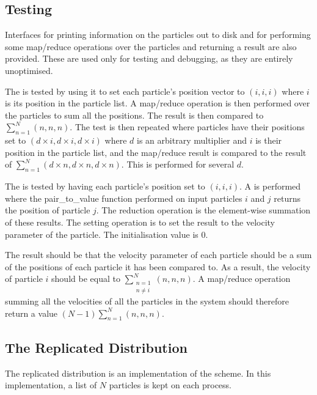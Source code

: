 \subsection{Testing}

Interfaces for printing information on the particles
out to disk and for performing some map/reduce operations over
the particles and returning a result are also provided.
%
These are used only for testing and debugging, as they are entirely
unoptimised.

The \individualoperation{} is tested by using it to set each particle's
position vector to $(i, i, i)$ where $i$ is its position in the
particle list.
%
A map/reduce operation is then performed over the particles to
sum all the positions.
%
The result is then compared to $\sum_{n=1}^N (n, n, n)$.
%
The test is then repeated where particles have their positions set to
$(d\times{}i, d\times{}i, d\times{}i)$
where $d$ is an arbitrary multiplier and $i$ is their
position in the particle list, and the map/reduce result is
compared to the result of $\sum_{n=1}^N (d\times{}n, d\times{}n, d\times{}n)$.
%
This is performed for several $d$.

The \pairoperation{} is tested by having each particle's position set
to $(i, i, i)$.
%
A \pairoperation{} is performed where the pair\_to\_value function
performed on input particles $i$ and
$j$ returns the position of particle $j$.
%
The reduction operation is the element-wise summation of these results.
%
The setting operation is to set the result to the velocity parameter of
the particle.
%
The initialisation value is 0.

The result should be that the velocity parameter of each particle should
be a sum of the positions of each particle it has been compared to.
%
As a result, the velocity of particle $i$ should be equal to
$\sum_{\substack{n=1\\n\ne{}i}}^N (n, n, n)$.
%
A map/reduce operation summing all the velocities of all the particles
in the system should therefore return a value
$(N-1)\sum_{n=1}^N (n, n, n)$.


\subsection{The Replicated Distribution}

%
The replicated distribution is an implementation of the \replicateddata{}
scheme.
%
In this implementation, a list of $N$ particles is kept on each process.

